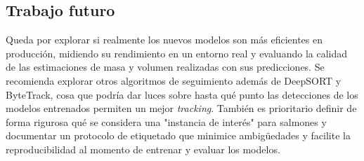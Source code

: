 \subsection{Trabajo futuro}
Queda por explorar si realmente los nuevos modelos son más eficientes en producción, midiendo su rendimiento en un entorno real y evaluando la calidad de las estimaciones de masa y volumen realizadas con sus predicciones. Se recomienda explorar otros algoritmos de seguimiento además de DeepSORT y ByteTrack, cosa que podría dar luces sobre hasta qué punto las detecciones de los modelos entrenados permiten un mejor \textit{tracking}. También es prioritario definir de forma rigurosa qué se considera una "instancia de interés" para salmones y documentar un protocolo de etiquetado que minimice ambigüedades y facilite la reproducibilidad al momento de entrenar y evaluar los modelos.
